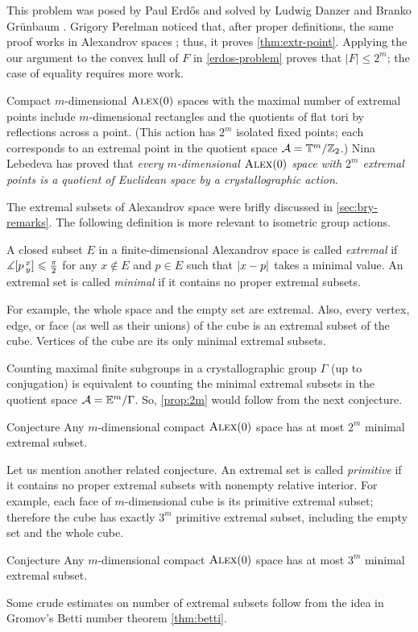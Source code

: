 This problem was posed by Paul Erdős \cite{erdos} and solved by Ludwig Danzer and Branko Gr\"unbaum \cite{danzer-gruenbaum}.
Grigory Perelman noticed that, after proper definitions, the same proof works in Alexandrov spaces \cite{perelman-Erdos}; thus, it proves \ref{thm:extr-point}.
Applying the our argument to the convex hull of $F$ in \ref{erdos-problem} proves that $|F|\le 2^m$;
the case of equality requires more work.

Compact $m$-dimensional $\textsc{Alex}(0)$ spaces with the maximal number of extremal points include $m$-dimensional rectangles and the quotients of flat tori by reflections across a point.
(This action has $2^m$ isolated fixed points; each corresponds to an extremal point in the quotient space $\mathcal{A}=\mathbb{T}^m/\mathbb{Z}_2$.)
Nina Lebedeva has proved \cite{lebedeva2015} that \textit{every $m$-dimensional $\textsc{Alex}(0)$ space with $2^m$ extremal points is a quotient of Euclidean space by a crystallographic action}.

The extremal subsets of Alexandrov space were brifly discussed in \ref{sec:bry-remarks}.
The following definition is more relevant to isometric group actions.

A closed subset $E$ in a finite-dimensional Alexandrov space is called
\emph{extremal} if $\measuredangle[p\,{}^{x}_{y}]\leqslant \tfrac\pi2$ for any $x\notin E$ and $p\in E$ such that $|{x}-{p}|_{}^{{}}$ takes a minimal value.
An extremal set is called \emph{minimal} if it contains no proper extremal subsets.

For example, the whole space and the empty set are extremal.
Also, every vertex, edge, or face (as well as their unions) of the cube is an extremal subset of the cube.
Vertices of the cube are its only minimal extremal subsets.

Counting maximal finite subgroups in a crystallographic group $\Gamma$ (up to conjugation) is equivalent to counting the minimal extremal subsets in the quotient space $\mathcal{A}=\mathbb{E}^m/\Gamma$.
So, \ref{prop:2m} would follow from the next conjecture.

\begin{thm}{Conjecture}
Any $m$-dimensional compact $\textsc{Alex}(0)$ space has at most $2^m$ minimal extremal subset.
\end{thm}

Let us mention another related conjecture.
An extremal set is called \emph{primitive} if it contains no proper extremal subsets with nonempty relative interior.
For example, each face of $m$-dimensional cube is its primitive extremal subset;
therefore the cube has exactly $3^m$ primitive extremal subset, including the empty set and the whole cube.

\begin{thm}{Conjecture}
Any $m$-dimensional compact $\textsc{Alex}(0)$ space has at most $3^m$ minimal extremal subset.
\end{thm}

Some crude estimates on number of extremal subsets follow from the idea in Gromov's Betti number theorem \ref{thm:betti}.
